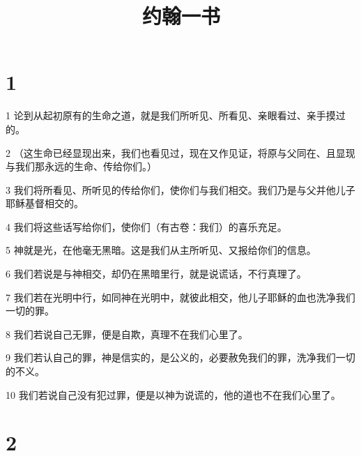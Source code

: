 

\title{约翰一书}


\chapter{1}

\par 1 论到从起初原有的生命之道，就是我们所听见、所看见、亲眼看过、亲手摸过的。
\par 2 （这生命已经显现出来，我们也看见过，现在又作见证，将原与父同在、且显现与我们那永远的生命、传给你们。）
\par 3 我们将所看见、所听见的传给你们，使你们与我们相交。我们乃是与父并他儿子耶稣基督相交的。
\par 4 我们将这些话写给你们，使你们（有古卷：我们）的喜乐充足。
\par 5 神就是光，在他毫无黑暗。这是我们从主所听见、又报给你们的信息。
\par 6 我们若说是与神相交，却仍在黑暗里行，就是说谎话，不行真理了。
\par 7 我们若在光明中行，如同神在光明中，就彼此相交，他儿子耶稣的血也洗净我们一切的罪。
\par 8 我们若说自己无罪，便是自欺，真理不在我们心里了。
\par 9 我们若认自己的罪，神是信实的，是公义的，必要赦免我们的罪，洗净我们一切的不义。
\par 10 我们若说自己没有犯过罪，便是以神为说谎的，他的道也不在我们心里了。

\chapter{2}

